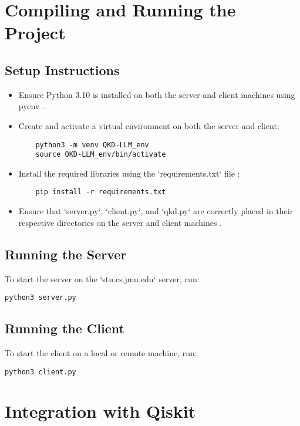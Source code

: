 \documentclass{article}
\begin{document}
\section{Compiling and Running the Project}

\subsection{Setup Instructions}
\begin{itemize}
    \item Ensure Python 3.10 is installed on both the server and client machines using pyenv \parencite{nielsen2010}.
    \item Create and activate a virtual environment on both the server and client:
    \begin{verbatim}
    python3 -m venv QKD-LLM_env
    source QKD-LLM_env/bin/activate
    \end{verbatim}
    \item Install the required libraries using the `requirements.txt` file \parencite{tanenbaum2020}:
    \begin{verbatim}
    pip install -r requirements.txt
    \end{verbatim}
    \item Ensure that `server.py`, `client.py`, and `qkd.py` are correctly placed in their respective directories on the server and client machines \parencite{lo2012}.
\end{itemize}

\subsection{Running the Server}
To start the server on the `stu.cs.jmu.edu` server, run:
\begin{verbatim}
python3 server.py
\end{verbatim}

\subsection{Running the Client}
To start the client on a local or remote machine, run:
\begin{verbatim}
python3 client.py
\end{verbatim}

\section{Integration with Qiskit}
\end{document}

